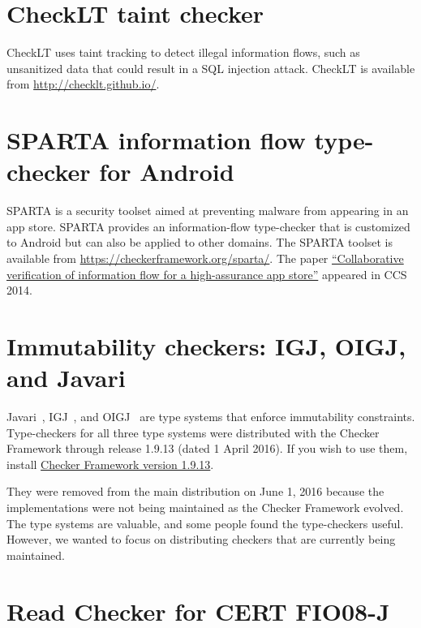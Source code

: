 \section{CheckLT taint checker\label{checklt-checker}}

CheckLT uses taint tracking to detect illegal information flows, such as
unsanitized data that could result in a SQL injection attack.
CheckLT is available from \url{http://checklt.github.io/}.


\section{SPARTA information flow type-checker for Android\label{sparta-checker}}

SPARTA is a security toolset aimed at preventing malware from appearing in
an app store.  SPARTA provides an information-flow type-checker that is
customized to Android but can also be applied to other domains.
The SPARTA toolset is available from
\url{https://checkerframework.org/sparta/}.
The paper
\href{http://homes.cs.washington.edu/~mernst/pubs/infoflow-ccs2014.pdf}{``Collaborative
    verification of information flow for a high-assurance app store''}
  appeared in CCS 2014.


\section{Immutability checkers:  IGJ, OIGJ, and Javari\label{igj-checker}\label{javari-checker}}

Javari~\cite{TschantzE2005}, IGJ~\cite{ZibinPAAKE2007}, and
OIGJ~\cite{ZibinPLAE2010} are type systems that enforce immutability
constraints.  Type-checkers for all three type systems were distributed
with the Checker Framework through release 1.9.13 (dated 1 April 2016).
If you wish to use them, install
\href{https://checkerframework.org/releases/1.9.13/}{Checker
  Framework version 1.9.13}.

They were removed from the main distribution on June 1, 2016 because the
implementations were not being maintained as the Checker Framework evolved.
The type systems are valuable, and some people found the type-checkers
useful.  However,
we wanted
to focus on distributing checkers that are currently being maintained.


\section{Read Checker for CERT FIO08-J\label{read-checker}}

